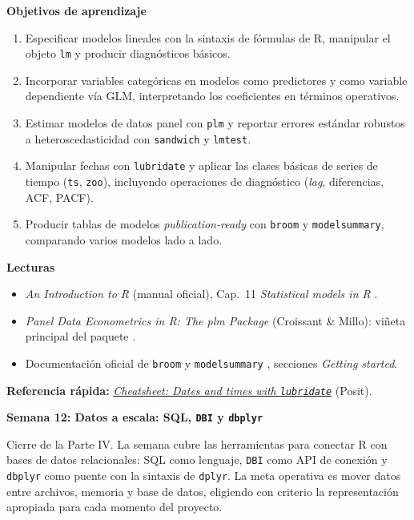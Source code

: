 \documentclass[11pt,letterpaper]{article}
\newcommand{\semana}[2]{%
  \bigskip%
  {\color{main}\Large\bfseries Semana #1: #2\par}%
  \smallskip%
}
\newcommand{\cheatsheet}[2]{%
  \href{https://rstudio.github.io/cheatsheets/#1.pdf}{\textit{Cheatsheet: #2}}%
}
\begin{document}
\medskip
\noindent\textbf{Objetivos de aprendizaje}
\begin{enumerate}[leftmargin=*, itemsep=1pt]
    \item Especificar modelos lineales con la sintaxis de fórmulas de R, manipular el objeto \texttt{lm} y producir diagnósticos básicos.
    \item Incorporar variables categóricas en modelos como predictores y como variable dependiente vía GLM, interpretando los coeficientes en términos operativos.
    \item Estimar modelos de datos panel con \texttt{plm} y reportar errores estándar robustos a heteroscedasticidad con \texttt{sandwich} y \texttt{lmtest}.
    \item Manipular fechas con \texttt{lubridate} y aplicar las clases básicas de series de tiempo (\texttt{ts}, \texttt{zoo}), incluyendo operaciones de diagnóstico (\textit{lag}, diferencias, ACF, PACF).
    \item Producir tablas de modelos \textit{publication-ready} con \texttt{broom} y \texttt{modelsummary}, comparando varios modelos lado a lado.
\end{enumerate}

\medskip
\noindent\textbf{Lecturas}
\begin{itemize}[leftmargin=*, itemsep=1pt]
    \item \textit{An Introduction to R} (manual oficial), Cap.\ 11 \textit{Statistical models in R} \cite{rcoreteam-intro}.
    \item \textit{Panel Data Econometrics in R: The plm Package} (Croissant \& Millo): viñeta principal del paquete \cite{croissant-plm}.
    \item Documentación oficial de \texttt{broom} \cite{robinson-broom} y \texttt{modelsummary} \cite{arelbundock-modelsummary}, secciones \textit{Getting started}.
\end{itemize}

\medskip
\noindent\textbf{Referencia rápida:} \cheatsheet{lubridate}{Dates and times with \texttt{lubridate}} (Posit).

\semana{12}{Datos a escala: SQL, \texttt{DBI} y \texttt{dbplyr}}

Cierre de la Parte IV. La semana cubre las herramientas para conectar R con bases de datos relacionales: SQL como lenguaje, \texttt{DBI} como API de conexión y \texttt{dbplyr} como puente con la sintaxis de \texttt{dplyr}. La meta operativa es mover datos entre archivos, memoria y base de datos, eligiendo con criterio la representación apropiada para cada momento del proyecto.
\end{document}
